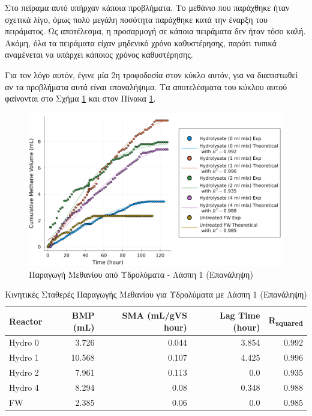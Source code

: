 \documentclass[11pt]{report}
\begin{document}
\begin{enumerate}
Στο πείραμα αυτό υπήρχαν κάποια προβλήματα. Το μεθάνιο που παράχθηκε ήταν σχετικά λίγο, όμως πολύ μεγάλη ποσότητα παράχθηκε κατά την έναρξη του πειράματος. Ως αποτέλεσμα, η προσαρμογή σε κάποια πειράματα δεν ήταν τόσο καλή. Ακόμη, όλα τα πειράματα είχαν μηδενικό χρόνο καθυστέρησης, παρότι τυπικά αναμένεται να υπάρχει κάποιος χρόνος καθυστέρησης.

Για τον λόγο αυτόν, έγινε μία 2η τροφοδοσία στον κύκλο αυτόν, για να διαπιστωθεί αν τα προβλήματα αυτά είναι επαναλήψιμα. Τα αποτελέσματα του κύκλου αυτού φαίνονται στο Σχήμα \ref{fig:org655c6dc} και στον Πίνακα \ref{tab:orgeeb3406}.

\begin{figure}[htbp]
\centering
\includegraphics[width=.9\linewidth]{../plots/BMPs/methane_s1_r2_comp.png}
\caption{\label{fig:org655c6dc}Παραγωγή Μεθανίου από Υδρολύματα - Λάσπη 1 (Επανάληψη)}
\end{figure}

\begin{table}[htbp]
\caption{\label{tab:orgeeb3406}Κινητικές Σταθερές Παραγωγής Μεθανίου για Υδρολύματα με Λάσπη 1 (Επανάληψη)}
\centering
\begin{tabular}{lrrrr}
Reactor & BMP (mL) & SMA (mL/gVS hour) & Lag Time (hour) & R\textsubscript{squared}\\[0pt]
\hline
Hydro 0 & 3.726 & 0.044 & 3.854 & 0.992\\[0pt]
Hydro 1 & 10.568 & 0.107 & 4.425 & 0.996\\[0pt]
Hydro 2 & 7.961 & 0.113 & 0.0 & 0.935\\[0pt]
Hydro 4 & 8.294 & 0.08 & 0.348 & 0.988\\[0pt]
FW & 2.385 & 0.06 & 0.0 & 0.985\\[0pt]
\end{tabular}
\end{table}


\end{enumerate}
\end{document}
